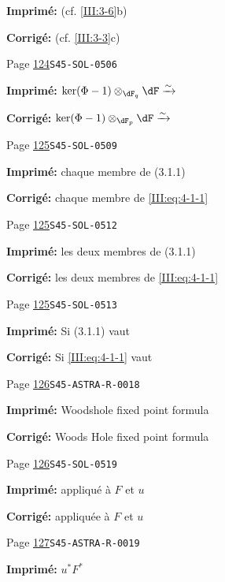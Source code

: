 \documentclass[oneside]{book}
\newcommand{\iso}{\xrightarrow\sim}
\theoremstyle{sga-source}
\theoremstyle{sga-source-dash}
\theoremstyle{sga-source-dotdash}
\theoremstyle{sga-source-number-note-dash}
\theoremstyle{sga-source-note-number-dotdash}
\theoremstyle{sga-source-example-dotdash}
\theoremstyle{sga-source-inline-number}
\theoremstyle{sga-source-bare-number}
\theoremstyle{sga-source}
\begin{document}
\begin{description}
\par\noindent\textbf{Imprimé:} (cf. \ref{III:3-6}b)
\par\noindent\textbf{Corrigé:} (cf. \ref{III:3-3}c)
\smallskip
\item[\hypertarget{apparatus:FR-0084}{84}] Page \hyperlink{printpage:fr:124}{124}\quad\texttt{S45-SOL-0506}
\par\noindent\textbf{Imprimé:} \(\ker(\Phi-1)\otimes_{\dF_q}\dF \iso\)
\par\noindent\textbf{Corrigé:} \(\ker(\Phi-1)\otimes_{\dF_p}\dF \iso\)
\smallskip
\item[\hypertarget{apparatus:FR-0085}{85}] Page \hyperlink{printpage:fr:125}{125}\quad\texttt{S45-SOL-0509}
\par\noindent\textbf{Imprimé:} chaque membre de (3.1.1)
\par\noindent\textbf{Corrigé:} chaque membre de \eqref{III:eq:4-1-1}
\smallskip
\item[\hypertarget{apparatus:FR-0086}{86}] Page \hyperlink{printpage:fr:125}{125}\quad\texttt{S45-SOL-0512}
\par\noindent\textbf{Imprimé:} les deux membres de (3.1.1)
\par\noindent\textbf{Corrigé:} les deux membres de \eqref{III:eq:4-1-1}
\smallskip
\item[\hypertarget{apparatus:FR-0087}{87}] Page \hyperlink{printpage:fr:125}{125}\quad\texttt{S45-SOL-0513}
\par\noindent\textbf{Imprimé:} Si (3.1.1) vaut
\par\noindent\textbf{Corrigé:} Si \eqref{III:eq:4-1-1} vaut
\smallskip
\item[\hypertarget{apparatus:FR-0088}{88}] Page \hyperlink{printpage:fr:126}{126}\quad\texttt{S45-ASTRA-R-0018}
\par\noindent\textbf{Imprimé:} Woodshole fixed point formula
\par\noindent\textbf{Corrigé:} Woods Hole fixed point formula
\smallskip
\item[\hypertarget{apparatus:FR-0089}{89}] Page \hyperlink{printpage:fr:126}{126}\quad\texttt{S45-SOL-0519}
\par\noindent\textbf{Imprimé:} appliqué à $F$ et $u$
\par\noindent\textbf{Corrigé:} appliquée à $F$ et $u$
\smallskip
\item[\hypertarget{apparatus:FR-0090}{90}] Page \hyperlink{printpage:fr:127}{127}\quad\texttt{S45-ASTRA-R-0019}
\par\noindent\textbf{Imprimé:} \(u^* F^*\)

\end{description}
\end{document}
